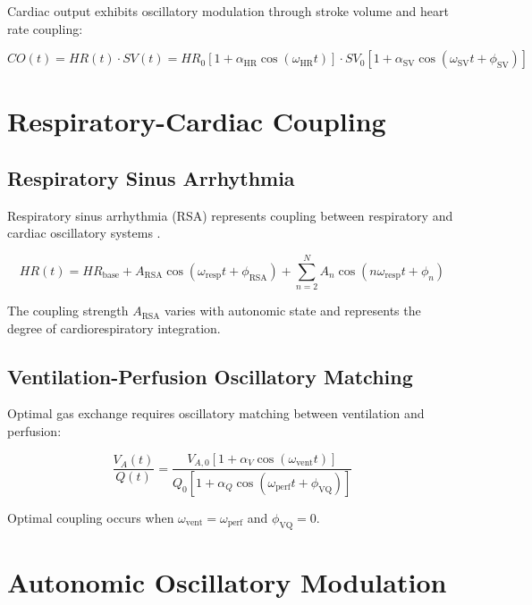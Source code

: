 \documentclass[twocolumn]{article}
\begin{document}
Cardiac output exhibits oscillatory modulation through stroke volume and heart rate coupling:

\begin{equation}
CO(t) = HR(t) \cdot SV(t) = HR_0[1 + \alpha_{\text{HR}} \cos(\omega_{\text{HR}}t)] \cdot SV_0[1 + \alpha_{\text{SV}} \cos(\omega_{\text{SV}}t + \phi_{\text{SV}})]
\label{eq:cardiac_output}
\end{equation}

\section{Respiratory-Cardiac Coupling}

\subsection{Respiratory Sinus Arrhythmia}

Respiratory sinus arrhythmia (RSA) represents coupling between respiratory and cardiac oscillatory systems \citep{berntson1993respiratory}.

\begin{equation}
HR(t) = HR_{\text{base}} + A_{\text{RSA}} \cos(\omega_{\text{resp}}t + \phi_{\text{RSA}}) + \sum_{n=2}^N A_n \cos(n\omega_{\text{resp}}t + \phi_n)
\label{eq:rsa}
\end{equation}

The coupling strength $A_{\text{RSA}}$ varies with autonomic state and represents the degree of cardiorespiratory integration.

\subsection{Ventilation-Perfusion Oscillatory Matching}

Optimal gas exchange requires oscillatory matching between ventilation and perfusion:

\begin{equation}
\frac{V_A(t)}{Q(t)} = \frac{V_{A,0}[1 + \alpha_V \cos(\omega_{\text{vent}}t)]}{Q_0[1 + \alpha_Q \cos(\omega_{\text{perf}}t + \phi_{\text{VQ}})]}
\label{eq:vq_matching}
\end{equation}

Optimal coupling occurs when $\omega_{\text{vent}} = \omega_{\text{perf}}$ and $\phi_{\text{VQ}} = 0$.

\section{Autonomic Oscillatory Modulation}
\end{document}
